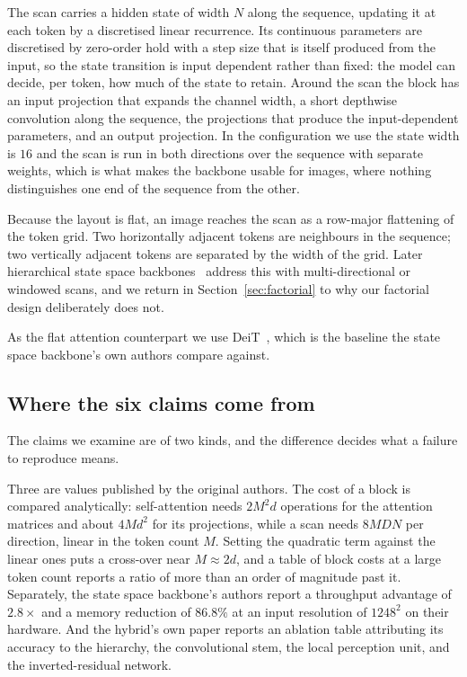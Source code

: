 The scan carries a hidden state of width $N$ along the sequence, updating it
at each token by a discretised linear recurrence. Its continuous parameters
are discretised by zero-order hold with a step size that is itself produced
from the input, so the state transition is input dependent rather than fixed:
the model can decide, per token, how much of the state to retain. Around the
scan the block has an input projection that expands the channel width, a
short depthwise convolution along the sequence, the projections that produce
the input-dependent parameters, and an output projection. In the
configuration we use the state width is $16$ and the scan is run in both
directions over the sequence with separate weights, which is what makes the
backbone usable for images, where nothing distinguishes one end of the
sequence from the other.

Because the layout is flat, an image reaches the scan as a row-major
flattening of the token grid. Two horizontally adjacent tokens are
neighbours in the sequence; two vertically adjacent tokens are separated by
the width of the grid. Later hierarchical state space
backbones~\citep{liu2024vmamba,huang2024localmamba} address this with
multi-directional or windowed scans, and we return in
Section~\ref{sec:factorial} to why our factorial design deliberately does
not.

As the flat attention counterpart we use DeiT~\citep{touvron2021deit}, which
is the baseline the state space backbone's own authors compare against.

\subsection{Where the six claims come from}

The claims we examine are of two kinds, and the difference decides what a
failure to reproduce means.

Three are values published by the original authors. The cost of a block is
compared analytically: self-attention needs $2M^2d$ operations for the
attention matrices and about $4Md^2$ for its projections, while a scan needs
$8MDN$ per direction, linear in the token count $M$. Setting the quadratic
term against the linear ones puts a cross-over near $M \approx 2d$, and a
table of block costs at a large token count reports a ratio of more than an
order of magnitude past it. Separately, the state space backbone's authors
report a throughput advantage of $2.8\times$ and a memory reduction of
$86.8\%$ at an input resolution of $1248^2$ on their hardware. And the
hybrid's own paper reports an ablation table attributing its accuracy to the
hierarchy, the convolutional stem, the local perception unit, and the
inverted-residual network.

